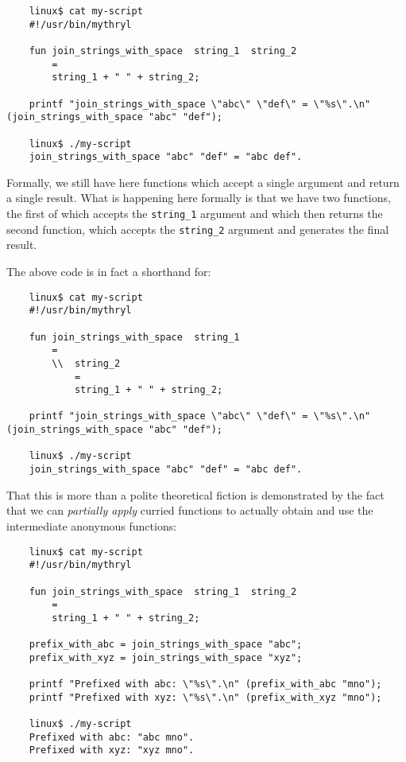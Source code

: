 \begin{verbatim}
    linux$ cat my-script
    #!/usr/bin/mythryl

    fun join_strings_with_space  string_1  string_2
        =
        string_1 + " " + string_2;

    printf "join_strings_with_space \"abc\" \"def\" = \"%s\".\n" (join_strings_with_space "abc" "def");

    linux$ ./my-script
    join_strings_with_space "abc" "def" = "abc def".
\end{verbatim}

Formally, we still have here functions which accept a single 
argument and return a single result.  What is happening here 
formally is that we have two functions, the first of which 
accepts the {\tt string\_1} argument and which then returns 
the second function, which accepts the {\tt string\_2} argument 
and generates the final result.

The above code is in fact a shorthand for:

\begin{verbatim}
    linux$ cat my-script
    #!/usr/bin/mythryl

    fun join_strings_with_space  string_1
        =
        \\  string_2
            =
            string_1 + " " + string_2;

    printf "join_strings_with_space \"abc\" \"def\" = \"%s\".\n" (join_strings_with_space "abc" "def");

    linux$ ./my-script
    join_strings_with_space "abc" "def" = "abc def".
\end{verbatim}

That this is more than a polite theoretical fiction is 
demonstrated by the fact that we can {\it partially apply} 
curried functions to actually obtain and use the intermediate 
anonymous functions:

\begin{verbatim}
    linux$ cat my-script
    #!/usr/bin/mythryl

    fun join_strings_with_space  string_1  string_2
        =
        string_1 + " " + string_2;

    prefix_with_abc = join_strings_with_space "abc";
    prefix_with_xyz = join_strings_with_space "xyz";

    printf "Prefixed with abc: \"%s\".\n" (prefix_with_abc "mno");
    printf "Prefixed with xyz: \"%s\".\n" (prefix_with_xyz "mno");

    linux$ ./my-script
    Prefixed with abc: "abc mno".
    Prefixed with xyz: "xyz mno".
\end{verbatim}


